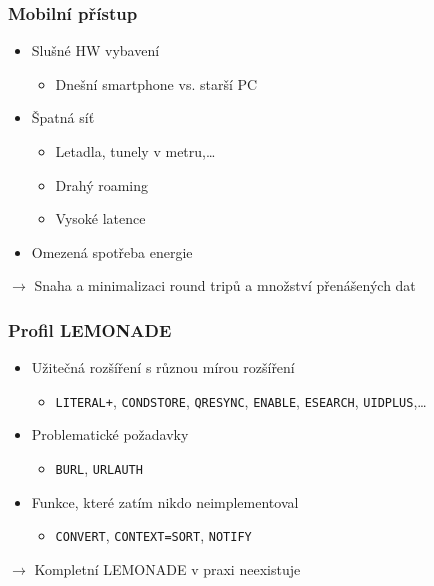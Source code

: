 \documentclass{beamer}
\begin{document}
\begin{frame}[fragile]
  \frametitle{Mobilní přístup}
  \begin{itemize}
    \item Slušné HW vybavení
      \begin{itemize}
        \item Dnešní smartphone vs. starší PC
      \end{itemize}
    \item Špatná síť
      \begin{itemize}
        \item Letadla, tunely v metru,\ldots
        \item Drahý roaming
        \item Vysoké latence
      \end{itemize}
    \item Omezená spotřeba energie
  \end{itemize}

   {
  \vspace{4mm}
  $\rightarrow$ \alert{Snaha a minimalizaci round tripů a množství přenášených dat}}
\end{frame}

\begin{frame}[fragile]
  \frametitle{Profil LEMONADE}
  \begin{itemize}
    \item Užitečná rozšíření s různou mírou rozšíření
      \begin{itemize}
        \item {\tt LITERAL+}, {\tt CONDSTORE}, {\tt QRESYNC}, {\tt ENABLE}, {\tt ESEARCH}, {\tt UIDPLUS},\ldots
      \end{itemize}
    \item Problematické požadavky
      \begin{itemize}
        \item {\tt BURL}, {\tt URLAUTH}
      \end{itemize}
    \item Funkce, které zatím nikdo neimplementoval
      \begin{itemize}
        \item {\tt CONVERT}, {\tt CONTEXT=SORT}, {\tt NOTIFY}
      \end{itemize}
  \end{itemize}

   {
  \vspace{4mm}
  $\rightarrow$ \alert{Kompletní LEMONADE v praxi neexistuje}}
\end{frame}
\end{document}
